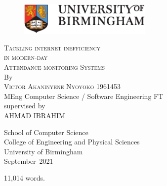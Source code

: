 \thispagestyle{empty}
\providecommand\pdfbookmark[3][]{} \pdfbookmark[0]{Title Page}{bm:Title}
\vspace*{1cm}
\begin{figure}[ht!]
  \includegraphics[width=6.5cm]{frontmatter/images/full-colour-logo.eps}
\end{figure}
\vfill
\begin{flushleft}
  \textsc{\huge{Tackling internet inefficiency }}\\[0.5em]
  \textsc{\huge{in modern-day}}\\[0.5em]
  \textsc{\huge{Attendance monitoring Systems}}\\[0.5em]
  \vfill
  By\\[\baselineskip]
  \textsc{\Large{Victor Akaninyene Nyoyoko}}
  \vfill
  1961453\\[-0.8em]
  MEng Computer Science / Software Engineering FT\\[-0.8em]
  \vfill
  supervised by\\[-0.8em]
  \vfill
  \MakeUppercase{AHMAD IBRAHIM} \\[\baselineskip]
\end{flushleft}
\begin{flushright}
  School of Computer Science\\[-0.8em]
  College of Engineering and Physical Sciences\\[-0.8em]
  University of Birmingham\\[-0.8em]
  September~2021 \\[\baselineskip]
\end{flushright}
\vspace*{4cm}
11,014 words.
\clearpage
